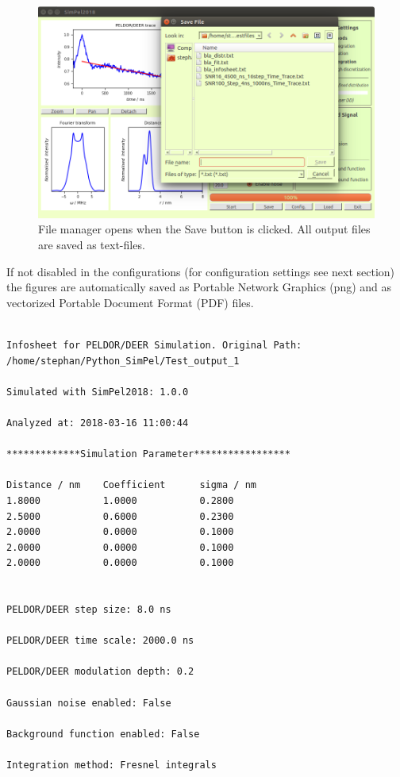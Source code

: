 \documentclass[pdftex,bezier,german,a4,twoside, headexclude,12pt,nochapterprefix, titlepage]{extarticle}
\begin{document}
\begin{figure}[!htb]
\centering
\includegraphics[scale=0.5]{Save_output_example.png}
    \caption{File manager opens when the Save button is clicked. All output files are saved as text-files.
    }
\label{Save_output_example}
\end{figure} 

If not disabled in the configurations (for configuration settings see next section) the figures are automatically saved as Portable Network Graphics (png) and  as vectorized Portable Document Format (PDF) files.

\newpage

\begin{lstlisting}[caption={Example for an automatically aved information sheet.},label = Information_sheet]

Infosheet for PELDOR/DEER Simulation. Original Path:
/home/stephan/Python_SimPel/Test_output_1

Simulated with SimPel2018: 1.0.0

Analyzed at: 2018-03-16 11:00:44

*************Simulation Parameter*****************

Distance / nm 	 Coefficient	  sigma / nm
1.8000	         1.0000	          0.2800	         
2.5000	         0.6000	          0.2300	         
2.0000	         0.0000	          0.1000	         
2.0000	         0.0000	          0.1000	         
2.0000	         0.0000	          0.1000	         


PELDOR/DEER step size: 8.0 ns

PELDOR/DEER time scale: 2000.0 ns

PELDOR/DEER modulation depth: 0.2

Gaussian noise enabled: False

Background function enabled: False

Integration method: Fresnel integrals
\end{lstlisting}
\end{document}
